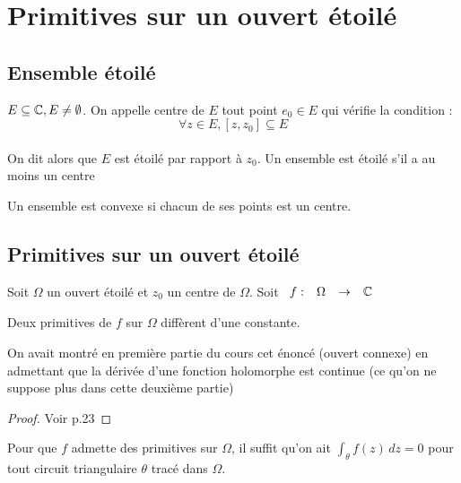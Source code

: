 \documentclass[]{report}
\begin{document}
\section{Primitives sur un ouvert étoilé}

\subsection{Ensemble étoilé}

\begin{df}{}{}
$E\subseteq\mathbb{C},E\neq\emptyset$. On appelle centre de $E$ tout point $e_0\in E$ qui vérifie la condition :$$\forall z\in E, [z,z_0]\subseteq E$$\\
On dit alors que $E$ est étoilé par rapport à $z_0$. Un ensemble est étoilé s'il a au moins un centre
\end{df}

\begin{ex}{}{}
    Un ensemble est convexe si chacun de ses points est un centre.
\end{ex}

\subsection{Primitives sur un ouvert étoilé}

Soit $\Omega$ un ouvert étoilé et $z_0$ un centre de $\Omega$. Soit $\begin{array}{ccccc}
f : & \Omega & \to & \mathbb{C}
\end{array}$

\begin{lm}{}{}
    Deux primitives de $f$ sur $\Omega$ diffèrent d'une constante.
\end{lm}

\begin{re}{}{}
    On avait montré en première partie du cours cet énoncé (ouvert connexe) en admettant que la dérivée d'une fonction holomorphe est continue (ce qu'on ne suppose plus dans cette deuxième partie)
\end{re}

\begin{proof}{}{}
    Voir p.23
\end{proof}

\begin{prop}{}{}
    Pour que $f$ admette des primitives sur $\Omega$, il suffit qu'on ait $\displaystyle{\int_\theta f(z)\,dz=0}$ pour tout circuit triangulaire $\theta$ tracé dans $\Omega$.
\end{prop}
\end{document}
